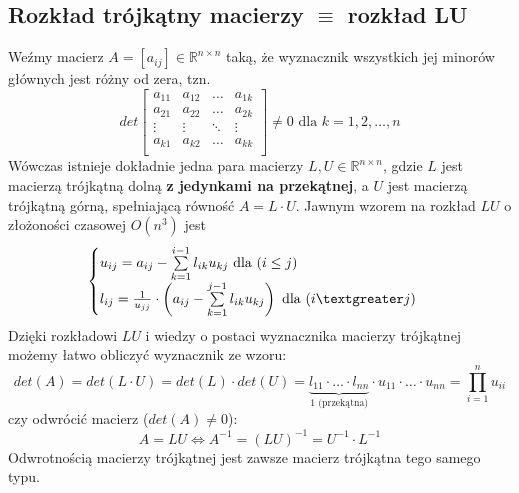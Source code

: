 \documentclass[a4paper,11pt]{article}
\begin{document}
\subsection{Rozkład trójkątny macierzy $\equiv$ rozkład LU}
Weźmy macierz $A = \left[ a_{ij} \right] \in \mathbb{R}^{n\times n}$ taką, że wyznacznik wszystkich jej minorów głównych jest różny od zera, tzn.
$$ 
det
\left[
\begin{array}{cccc}
a_{11} &  a_{12} & \ldots &  a_{1k} \\	
a_{21} &  a_{22} & \ldots &  a_{2k} \\	
\vdots  &   \vdots & \ddots &  \vdots \\	
a_{k1} &  a_{k2} &  \ldots &  a_{kk} \\	
\end{array}
\right]
\neq 0 \text{ dla } k = 1, 2, \ldots, n
$$
\noindent Wówczas istnieje dokładnie jedna para macierzy $L, U  \in \mathbb{R}^{n\times n}$, gdzie $L$ jest macierzą trójkątną dolną \textbf{z jedynkami na przekątnej}, a $U$ jest macierzą trójkątną górną, spełniającą równość $A=L\cdot U$. Jawnym wzorem na rozkład $LU$ o złożoności czasowej $O(n^3)$ jest
$$
\begin{cases}
u_{ij} = a_{ij} - \sum\limits_{k=1}^{i-1} l_{ik}u_{kj} \text{ dla } (i \leq j) \\
l_{ij} = \frac{1}{u_{jj}}\cdot \left( a_{ij} - \sum\limits_{k=1}^{j-1} l_{ik}u_{kj}\right) \text{ dla } (i \textgreater  j)
\end{cases}
$$
\noindent Dzięki rozkładowi $LU$ i wiedzy o postaci wyznacznika macierzy trójkątnej możemy łatwo obliczyć wyznacznik ze wzoru:
$$ det(A) = det(L\cdot U) = det(L) \cdot det(U) = \underbrace{l_{11}\cdot \ldots \cdot l_{nn}}_{1\text{ (przekątna)}} \cdot u_{11}\cdot \ldots \cdot u_{nn} = \prod\limits_{i=1}^{n} u_{ii}$$
\noindent czy odwrócić macierz ($det(A)\neq 0$):
$$ A=LU \Leftrightarrow A^{-1} = (LU)^{-1} = U^{-1} \cdot L^{-1}$$
\noindent Odwrotnością macierzy trójkątnej jest zawsze macierz trójkątna tego samego typu.
\end{document}

